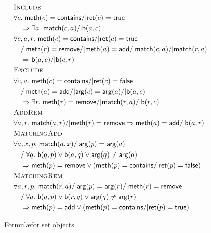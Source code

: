 \begin{figure}
  \footnotesize
  \begin{align*}
    & \textsc{Include} \\
    & \forall c.\ {\sf meth}(c) = {\sf contains} /| {\sf ret}(c) = {\sf true} \\
    & \quad => \exists a.\ {\sf match}(c,a) /| {\sf b}(a,c) \\
    & \forall c,a,r.\ {\sf meth}(c)={\sf contains} /| {\sf ret}(c) = {\sf true} \\
    & \quad /| {\sf meth}(r) = {\sf remove}/| {\sf meth}(a) = {\sf add} /|  {\sf match}(c,a) /| {\sf match}(r,a)  \\ %
    & \quad => {\sf b}(a,c) /| {\sf b}(c,r)
    \\
    & \textsc{Exclude} \\
    & \forall c,a.\ {\sf meth}(c)={\sf contains} /| {\sf ret}(c) = {\sf false} \\
    & \quad /| {\sf meth}(a) = {\sf add}/| {\sf arg}(c) = {\sf arg}(a) /| {\sf b}(a,c) \\
    & \quad => \exists r.\ {\sf meth}(r)={\sf remove} /| {\sf match}(r,a) /| {\sf b}(r,c)
    \\
    & \textsc{AddRem} \\
    & \forall a,r.\ {\sf match}(a,r) /| {\sf meth}(r) = {\sf remove}  => {\sf meth}(a)={\sf add} /| {\sf b}(a,r) 
    \\
    & \textsc{MatchingAdd} \\
    & \forall a,x,p.\ {\sf match}(a,x) /| {\sf arg}(p) = {\sf arg}(a) \\
    & \quad /| \forall q.\ {\sf b}(q,p) \vee {\sf b}(a,q) \vee {\sf arg}(q)\neq {\sf arg}(a) \\
    & \quad => {\sf meth}(p)={\sf remove} \vee ({\sf meth}(p)={\sf contains} /| {\sf ret}(p) = {\sf false}) 
    \\
    & \textsc{MatchingRem} \\
    & \forall a,r,p.\ {\sf match}(r,a) /| {\sf arg}(p) = {\sf arg}(r) /| {\sf meth}(r)={\sf remove}\\
    & \quad /| \forall q.\ {\sf b}(q,p) \vee {\sf b}(r,q) \vee {\sf arg}(q)\neq {\sf arg}(r) \\
    & \quad => {\sf meth}(p)={\sf add} \vee ({\sf meth}(p)={\sf contains} /| {\sf ret}(p) = {\sf true}) 
  \end{align*}
  \caption{Formul\ae for set objects.}
  \label{fig:formulas:set}
\end{figure}

